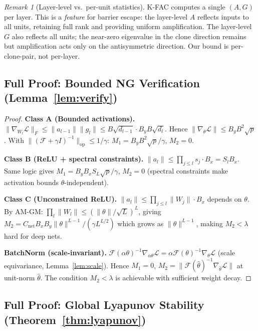 \documentclass{article}
\providecommand{\FIM}{\mathcal{F}}
\providecommand{\norm}[1]{\lVert #1 \rVert}
\theoremstyle{plain}
\theoremstyle{definition}
\theoremstyle{remark}
\newtheorem{remark}{Remark}
\begin{document}
\begin{remark}[Layer-level vs.\ per-unit statistics]
K-FAC computes a single $(A,G)$ per layer. This is a \emph{feature} for barrier escape: the layer-level $A$ reflects inputs to all units, retaining full rank and providing uniform amplification. The layer-level $G$ also reflects all units; the near-zero eigenvalue in the clone direction remains but amplification acts only on the antisymmetric direction. Our bound is per-clone-pair, not per-layer.
\end{remark}

\subsection{Full Proof: Bounded NG Verification (Lemma~\ref{lem:verify})}

\begin{proof}
\textbf{Class A (Bounded activations).} $\norm{\nabla_{W_l}\mathcal{L}}_F \leq \norm{a_{l-1}}\norm{g_l} \leq B\sqrt{d_{l-1}}\cdot B_y B\sqrt{d_l}$. Hence $\norm{\nabla_\theta\mathcal{L}} \leq B_y B^2\sqrt{p}$. With $\norm{(\FIM+\gamma I)^{-1}}_{\mathrm{op}} \leq 1/\gamma$: $M_1=B_yB^2\sqrt{p}/\gamma$, $M_2=0$.

\textbf{Class B (ReLU + spectral constraints).} $\norm{a_l}\leq\prod_{j\leq l}s_j\cdot B_x = S_l B_x$. Same logic gives $M_1=B_yB_xS_L\sqrt{p}/\gamma$, $M_2=0$ (spectral constraints make activation bounds $\theta$-independent).

\textbf{Class C (Unconstrained ReLU).} $\norm{a_l}\leq\prod_{j\leq l}\norm{W_j}\cdot B_x$ depends on $\theta$. By AM-GM: $\prod_l\norm{W_l}\leq(\norm{\theta}/\sqrt{L})^L$, giving $M_2 = C_{\mathrm{net}}B_xB_y\norm{\theta}^{L-1}/(\gamma L^{L/2})$ which grows as $\norm{\theta}^{L-1}$, making $M_2<\lambda$ hard for deep nets.

\textbf{BatchNorm (scale-invariant).} $\FIM(\alpha\theta)^{-1}\nabla_{\alpha\theta}\mathcal{L}=\alpha\FIM(\theta)^{-1}\nabla_\theta\mathcal{L}$ (scale equivariance, Lemma~\ref{lem:scale}). Hence $M_1=0$, $M_2=\norm{\FIM(\hat\theta)^{-1}\nabla_{\hat\theta}\mathcal{L}}$ at unit-norm $\hat\theta$. The condition $M_2<\lambda$ is achievable with sufficient weight decay.
\end{proof}

\subsection{Full Proof: Global Lyapunov Stability (Theorem~\ref{thm:lyapunov})}
\end{document}
